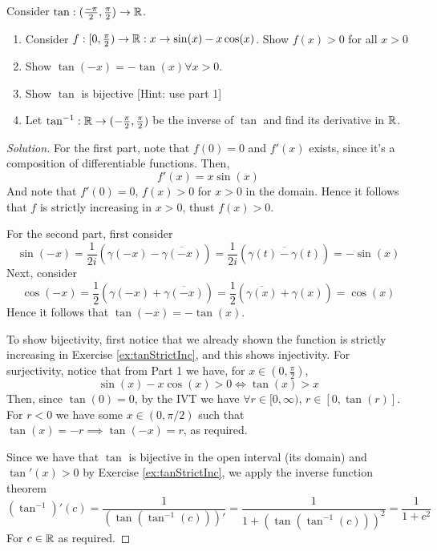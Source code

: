 \begin{exercise}
  Consider $\tan:(\frac{-\pi}{2},\frac{\pi}{2})\to\mathbb R$.
  \begin{enumerate}
    \item Consider $f:[0,\frac{\pi}{2})\to\mathbb R:x\to\sin(x)-x\cos(x)$. Show $f(x)>0$ for all
      $x>0$
    \item Show $\tan(-x)=-\tan(x)\forall x>0$.
    \item Show $\tan$ is bijective [Hint: use part 1]
    \item Let $\tan^{-1}:\mathbb R\to (-\frac{\pi}{2}, \frac{\pi}{2})$ be the inverse of $\tan$
      and find its derivative in $\mathbb R$.
    \end{enumerate}
\end{exercise}
\begin{proof}[Solution]
  For the first part, note that $f(0)=0$ and $f'(x)$ exists, since it's a composition of
  differentiable functions. Then, 
  \[f'(x)=x\sin(x)\]
  And note that $f'(0)=0$, $f(x)>0$ for $x>0$ in the domain. Hence it follows that $f$ is
  strictly increasing in $x>0$, thust $f(x)>0$.

  For the second part, first consider
  \[\sin(-x)=
  \frac{1}{2i}(\gamma(-x)-\overline{\gamma(-x)})=\frac{1}{2i}(\overline{\gamma(t)-\gamma(t)})=-\sin(x)\]
  Next, consider
  \[\cos(-x)=\frac{1}{2}(\gamma(-x)+\overline{\gamma(-x)})=
    \frac{1}{2}(\overline{\gamma(x)}+\gamma(x)) = \cos(x)\]
  Hence it follows that $\tan(-x)=-\tan(x)$.

  To show bijectivity, first notice that we already shown the function is strictly
  increasing in Exercise \ref{ex:tanStrictInc}, and this shows injectivity. For
  surjectivity, notice that from Part 1 we have, for $x\in(0,\frac{\pi}{2})$,
  \[\sin(x)-x\cos(x)>0 \iff \tan(x)>x\]
  Then, since $\tan(0)=0$, by the IVT we have $\forall r\in[0,\infty)$, $r\in[0,\tan(r)]$.
  For $r<0$ we have some $x\in(0,\pi/2)$ such that $\tan(x)=-r\implies \tan(-x)=r$, as
  required.

  Since we have that $\tan$ is bijective in the open interval (its domain) and
  $\tan'(x)>0$ by Exercise \ref{ex:tanStrictInc}, we apply the inverse function theorem
  \[(\tan^{-1})'(c)=\frac{1}{(\tan(\tan^{-1}(c)))'} = \frac{1}{1+ (\tan(\tan^{-1}(c)))^2}=
    \frac{1}{1+c^2}\]
  For $c\in\mathbb R$ as required.
\end{proof}



